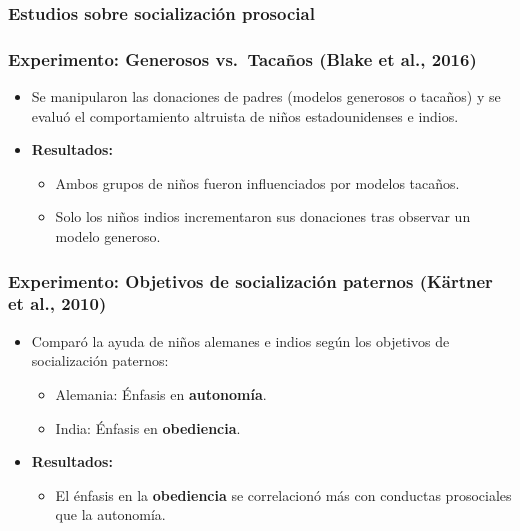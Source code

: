 \documentclass[
]{book}
\providecommand{\tightlist}{%
  \setlength{\itemsep}{0pt}\setlength{\parskip}{0pt}}
\begin{document}
\subsubsection{Estudios sobre socialización prosocial}\label{estudios-sobre-socializaciuxf3n-prosocial}

\subsubsection{\texorpdfstring{\textbf{Experimento: Generosos vs.~Tacaños (Blake et al., 2016)}}{Experimento: Generosos vs.~Tacaños (Blake et al., 2016)}}\label{experimento-generosos-vs.-tacauxf1os-blake-et-al.-2016}

\begin{itemize}
\tightlist
\item
  Se manipularon las donaciones de padres (modelos generosos o tacaños) y se evaluó el comportamiento altruista de niños estadounidenses e indios.\\
\item
  \textbf{Resultados:}

  \begin{itemize}
  \tightlist
  \item
    Ambos grupos de niños fueron influenciados por modelos tacaños.
  \item
    Solo los niños indios incrementaron sus donaciones tras observar un modelo generoso.
  \end{itemize}
\end{itemize}

\subsubsection{\texorpdfstring{\textbf{Experimento: Objetivos de socialización paternos (Kärtner et al., 2010)}}{Experimento: Objetivos de socialización paternos (Kärtner et al., 2010)}}\label{experimento-objetivos-de-socializaciuxf3n-paternos-kuxe4rtner-et-al.-2010}

\begin{itemize}
\tightlist
\item
  Comparó la ayuda de niños alemanes e indios según los objetivos de socialización paternos:

  \begin{itemize}
  \tightlist
  \item
    Alemania: Énfasis en \textbf{autonomía}.
  \item
    India: Énfasis en \textbf{obediencia}.
  \end{itemize}
\item
  \textbf{Resultados:}

  \begin{itemize}
  \tightlist
  \item
    El énfasis en la \textbf{obediencia} se correlacionó más con conductas prosociales que la autonomía.
  \end{itemize}
\end{itemize}
\end{document}
